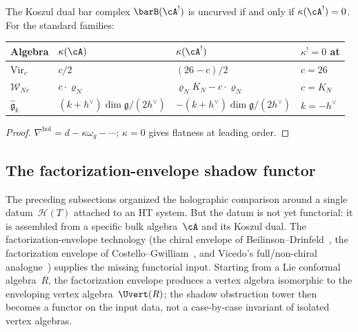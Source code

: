 \begin{corollary}
\label{cor:critical-dimensions}
The Koszul dual bar complex
$\barB(\cA^!)$ is uncurved if and only if
$\kappa(\cA^!)=0$. For the standard families:
\begin{center}
\renewcommand{\arraystretch}{1.2}
\begin{tabular}{llll}
\textbf{Algebra} & $\kappa(\cA)$ & $\kappa(\cA^!)$
 & \textbf{$\kappa^!=0$ at} \\
\hline
$\mathrm{Vir}_c$ & $c/2$ & $(26-c)/2$ & $c=26$ \\
$\mathcal W_N{}_c$ & $c\cdot\varrho_N$
 & $\varrho_N K_N - c\cdot\varrho_N$
 & $c=K_N$ \\
$\widehat{\mathfrak g}_k$
 & $(k{+}h^\vee)\dim\mathfrak g/(2h^\vee)$
 & $-(k{+}h^\vee)\dim\mathfrak g/(2h^\vee)$
 & $k=-h^\vee$
\end{tabular}
\end{center}
\end{corollary}

\begin{proof}
$\nabla^{\mathrm{hol}}=d-\kappa\omega_g-\cdots$; $\kappa=0$
gives flatness at leading order.
\end{proof}


\subsection{The factorization-envelope shadow functor}
\label{subsec:factorization-envelope-shadow-functor}

The preceding subsections organized the holographic comparison around
a single datum~$\mathcal{H}(T)$ attached to an HT system. But the
datum is not yet functorial: it is assembled from a specific bulk
algebra~$\cA$ and its Koszul dual. The factorization-envelope
technology (the chiral envelope of Beilinson--Drinfeld~\cite[\S3.7]{BD04},
the factorization envelope of Costello--Gwilliam~\cite{CG17}, and Vicedo's
full/non-chiral analogue~\cite{Vicedo25}) supplies the missing
functorial input. Starting from a Lie conformal algebra~$R$, the
factorization envelope produces a vertex algebra isomorphic to the
enveloping vertex algebra~$\Uvert(R)$; the shadow obstruction tower
then becomes a functor on the input data, not a case-by-case invariant
of isolated vertex algebras.

